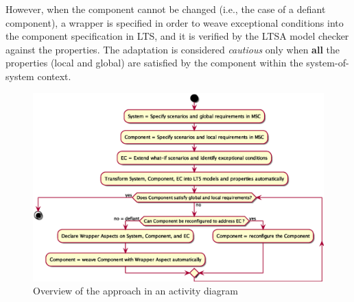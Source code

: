 However, when the component cannot be changed (i.e., the case of a defiant component), a wrapper is specified in order to weave exceptional conditions into the component specification in LTS, and it is verified by the LTSA model checker against the properties.  The adaptation is considered {\it cautious} only when {\bf all} the properties (local and global) are satisfied by the component within the system-of-system context.



\begin{figure}
 \includegraphics[width=0.9\columnwidth]{figures/activity.eps}
 \caption{Overview of the approach in an activity diagram}
 \label{fig:process}
 \vspace*{-0.5cm}
\end{figure}

